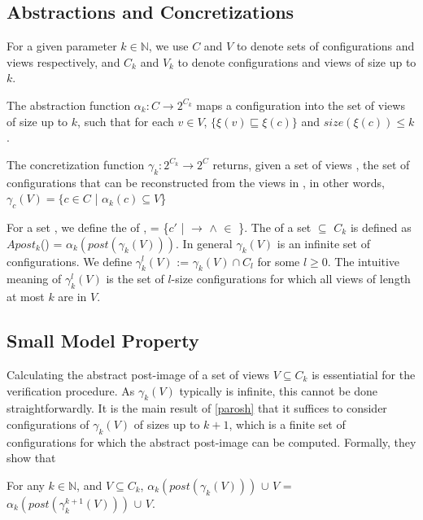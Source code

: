 \subsection{Abstractions and Concretizations}
\label{alphagamma}
For a given parameter $k \in \mathbb{N}$, we use $C$ and $V$ to denote sets of configurations and views respectively, and $C_k$ and $V_k$ to denote configurations and views of size up to $k$.

The abstraction function $\alpha_k: C\rightarrow 2^{C_k}$ maps a configuration  into the set  of views of size up to $k$, such that for each $v\in V$, $\{\xi(v)\sqsubseteq \xi(c)\}$ and $size(\xi(c)) \leq k$ . 

The concretization function $\gamma_k: 2^{C_k} \rightarrow 2^C$ returns, given a set of views , the set of configurations that can be reconstructed from the views in , in other words, $\gamma_c(V) = \{c \in C$ | $\alpha_k(c) \subseteq V$\}

For a set , we define the  of ,  = \{$c'$ |  $\rightarrow$  $\wedge$  $\in$ \}. The  of a set  $\subseteq$ $C_k$ is defined as $Apost_k$() = $\alpha_k(post(\gamma_k(V)))$. In general $\gamma_k(V)$ is an infinite set of configurations. We define $\gamma_k^l(V)$ := $\gamma_k(V) \cap C_l$ for some $l\geq 0$. The intuitive meaning of $\gamma_k^l(V)$ is the set of $l$-size configurations for which all views of length at most $k$ are in $V$.

\subsection{Small Model Property}
\label{proof}
Calculating the abstract post-image of a set of views $V \subseteq C_k$ is essentiatial for the verification procedure. As $\gamma_k(V)$ typically is infinite, this cannot be done straightforwardly. It is the main result of \ref{parosh} that it suffices to consider configurations of $\gamma_k(V)$ of sizes up to $k+1$, which is a finite set of configurations for which the abstract post-image can be computed. Formally, they show that

\begin{lemma}
\label{lemma1}
For any $k\in\mathbb{N}$, and $V\subseteq C_k$, $\alpha_k(post(\gamma_k(V)))$ $\cup$ $V$ = $\alpha_k(post(\gamma_k^{k+1}(V)))$ $\cup$ $V$.
\end{lemma}



